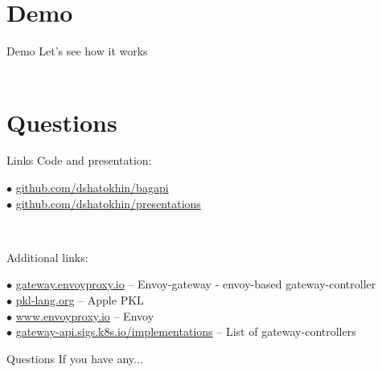 \documentclass[11pt, aspectratio=169]{beamer}
\begin{document}
\section{Demo}

\begin{frame}{ Demo}
	Let's see how it works\\~\\
	\centerline{{\Huge {}}}
\end{frame}

\section{Questions}

\begin{frame}{ Links}
	Code and presentation:
	\begin{description}
		\item [$\bullet$ \href{https://github.com/dshatokhin/bagapi}{github.com/dshatokhin/bagapi}]
		\item [$\bullet$ \href{https://github.com/dshatokhin/presentations}{github.com/dshatokhin/presentations}]
	\end{description}~

	Additional links:
	\begin{description}
		\item [$\bullet$ \href{https://gateway.envoyproxy.io}{gateway.envoyproxy.io}
		      -- Envoy-gateway - envoy-based gateway-controller]
		\item [$\bullet$ \href{https://pkl-lang.org}{pkl-lang.org}
		      -- Apple PKL]
		\item [$\bullet$ \href{https://www.envoyproxy.io}{www.envoyproxy.io}
		      -- Envoy]
		\item [$\bullet$ \href{https://gateway-api.sigs.k8s.io/implementations}{gateway-api.sigs.k8s.io/implementations}
		      -- List of gateway-controllers]
	\end{description}
\end{frame}

\begin{frame}{ Questions}
	If you have any...
\end{frame}
\end{document}

